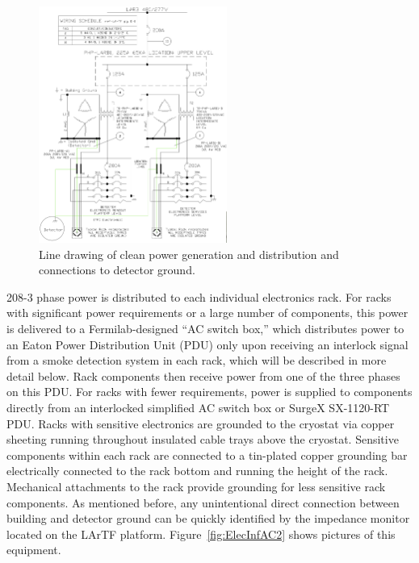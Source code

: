 \begin{figure}
\centering
\includegraphics[width=0.55\textwidth]{./figures/PowerDiagPic1.png}
\caption[]{Line drawing of clean power generation and distribution and connections to detector ground.}
\label{fig:ElecInfAC1}
\end{figure}






208-3 phase power is distributed to each individual electronics rack.  For racks with significant power requirements or a large number of components, this power is delivered to a Fermilab-designed ``AC switch box,'' which distributes power to an Eaton Power Distribution Unit (PDU) only upon receiving an interlock signal from a smoke detection system in each rack, which will be described in more detail below.  Rack components then receive power from one of the three phases on this PDU.  For racks with fewer requirements, power is supplied to components directly from an interlocked simplified AC switch box or SurgeX SX-1120-RT PDU.  Racks with sensitive electronics are grounded to the cryostat via copper sheeting running throughout insulated cable trays above the cryostat.  Sensitive components within each rack are connected to a tin-plated copper grounding bar electrically connected to the rack bottom and running the height of the rack.  Mechanical attachments to the rack provide grounding for less sensitive rack components.  As mentioned before, any unintentional direct connection between building and detector ground can be quickly identified by the impedance monitor located on the LArTF platform.  Figure~\ref{fig:ElecInfAC2} shows pictures of this equipment.

